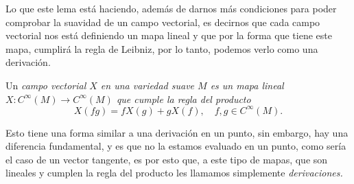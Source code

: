 Lo que este lema está haciendo, además de darnos más condiciones para poder comprobar la suavidad de un campo vectorial, es decirnos que cada campo vectorial nos está definiendo un mapa lineal y que por la forma que tiene este mapa, cumplirá la regla de Leibniz, por lo tanto, podemos verlo como una derivación.

\begin{definition}
	Un \it{campo vectorial} $X$ en una variedad suave $M$ es un mapa lineal $X: C^{\infty}(M) \to C^{\infty}(M)$ que cumple la regla del producto
	\[
		X(fg) = fX(g) + gX(f), \quad f,g \in C^{\infty}(M).
	\]
\end{definition}

Esto tiene una forma similar a una derivación en un punto, sin embargo, hay una diferencia fundamental, y es que no la estamos evaluado en un punto, como sería el caso de un vector tangente, es por esto que, a este tipo de mapas, que son lineales y cumplen la regla del producto les llamamos simplemente \it{derivaciones}.

